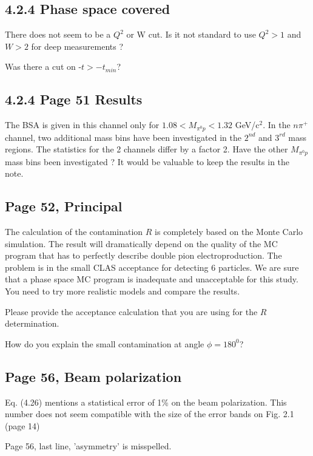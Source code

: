 \documentclass[11pt]{paper}
\begin{document}
\subsection*{4.2.4 Phase space covered}

There does not seem to be a $Q^2$ or W cut. Is it not standard to use $Q^2>1$ and $W>2$ for deep measurements ?

Was there a cut on -$t > -t_{min} $?

\subsection*{4.2.4 Page 51 Results}

The BSA is given in this channel only for $1.08 <M_{\pi^0p}<1.32$ GeV/c$^2$. 
In the $n\pi^+$ channel, two additional mass bins have been investigated in the $2^{nd}$ and $3^{rd}$ mass regions.
The statistics for the 2 channels differ by a factor 2.
Have the other  $M_{\pi^0p}$ mass bins been investigated ?
It would be valuable to keep the results in the note.

\subsection*{Page 52, Principal}

The calculation of the contamination $R$ is completely based on the Monte Carlo simulation.
The result will dramatically depend on the quality of the MC program that has to perfectly describe
double pion electroproduction. The problem is in the small CLAS acceptance for detecting 6 particles.
We are sure that a phase space MC program is inadequate and unacceptable for this study.
You need to try more realistic models and compare the results.

Please provide the acceptance calculation that you are using for the $R$ determination.

How do you explain the small contamination at angle $\phi=180^0$?

\subsection*{Page 56, Beam polarization}

Eq. (4.26) mentions a statistical error of 1\% on the beam polarization.
This number does not seem compatible with the size of the error bands on Fig. 2.1 (page 14)

Page 56, last line, 'asymmetry' is misspelled.
\end{document}
